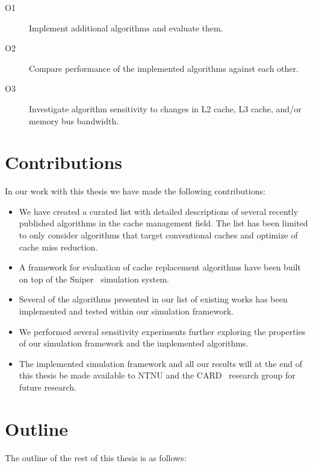 \begin{description}
    \item[O1] Implement additional algorithms and evaluate them.
    \item[O2] Compare performance of the implemented algorithms against each other.
    \item[O3] Investigate algorithm sensitivity to changes in L2 cache, L3 cache, and/or memory bus bandwidth.
\end{description}

\section{Contributions}

In our work with this thesis we have made the following contributions:

\begin{itemize}
  \item We have created a curated list with detailed descriptions of several recently published algorithms in the cache management field. The list has been limited to only consider algorithms that target conventional caches and optimize of cache miss reduction.
  \item A framework for evaluation of cache replacement algorithms have been built on top of the Sniper~\cite{Carlson2011a} simulation system.
  \item Several of the algorithms presented in our list of existing works has been implemented and tested within our simulation framework.
  \item We performed several sensitivity experiments further exploring the properties of our simulation framework and the implemented algorithms.
  \item The implemented simulation framework and all our results will at the end of this thesis be made available to NTNU and the CARD~\cite{CARD2015} research group for future research.
\end{itemize}

\section{Outline}

The outline of the rest of this thesis is as follows:

